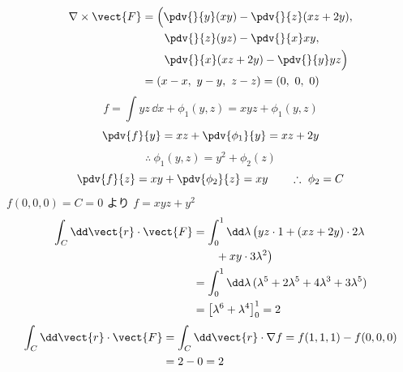 \begin{align*}
\nabla\times\vect{F}&=\Bigl(\pdv{}{y}(xy)-\pdv{}{z}(xz+2y),\\
&\qquad\pdv{}{z}(yz)-\pdv{}{x}xy,\\
&\qquad\pdv{}{x}(xz+2y)-\pdv{}{y}yz\Bigr)\\
&=(x-x,\ y-y,\ z-z)=(0,\ 0,\ 0)
\end{align*}
\[ f=\int yz\,\dd x+\phi_{1}(y,z)=xyz+\phi_{1}(y,z) \]
\[ \pdv{f}{y}=xz+\pdv{\phi_{1}}{y}=xz+2y \]
\[ \therefore\ \phi_{1}(y,z)=y^{2}+\phi_{2}(z) \]
\[ \pdv{f}{z}=xy+\pdv{\phi_{2}}{z}=xy\qquad\therefore\ \phi_{2}=C \]
$f(0,0,0)=C=0$ より $f=xyz+y^{2}$
\begin{align*}
\int_{C}\dd\vect{r}\cdot\vect{F}&=\int_{0}^{1}\dd\lambda\,\bigl(yz\cdot1+(xz+2y)\cdot2\lambda\\
&\qquad+xy\cdot3\lambda^{2}\bigr)\\
&=\int_{0}^{1}\dd\lambda\,(\lambda^{5}+2\lambda^{5}+4\lambda^{3}+3\lambda^{5})\\
&=\bigl[\lambda^{6}+\lambda^{4}\bigr]_{0}^{1}=2
\end{align*}
\begin{align*}
\int_{C}\dd\vect{r}\cdot\vect{F}&=\int_{C}\dd\vect{r}\cdot\nabla f=f(1,1,1)-f(0,0,0)\\
&=2-0=2
\end{align*}
